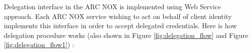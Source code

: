 \documentclass{article}                            %
\begin{document}
\begin{figure}
\end{figure}

Delegation interface in the ARC NOX is implemented using Web Service approach. Each ARC NOX service wishing to act on behalf of client identity implements this interface in order to accept delegated credentials. Here is how delegation procedure works (also shown in Figure \ref{fig:delegation_flow} and Figure \ref{fig:delegation_flow1}) :
\end{document}
